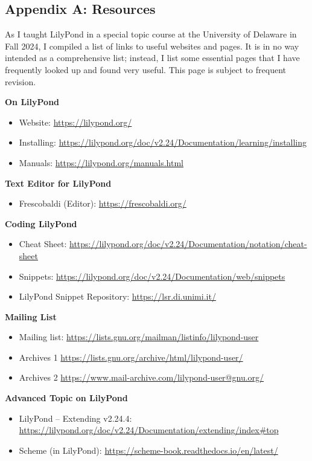 \documentclass[11pt, oneside]{book}   	%
\begin{document}
\begin{appendices}
\chapter{Appendix A: Resources}

As I taught LilyPond in a special topic course at the University of Delaware in Fall 2024, I compiled a list of links to useful websites and pages. It is in no way intended as a comprehensive list; instead, I list some essential pages that I have frequently looked up and found very useful. This page is subject to frequent revision.

\textbf{On LilyPond}
\begin{itemize}
\item Website:	\url{https://lilypond.org/}
\item Installing: \url{https://lilypond.org/doc/v2.24/Documentation/learning/installing}
\item Manuals: \url{https://lilypond.org/manuals.html} 
\end{itemize}
\textbf{Text Editor for LilyPond}
\begin{itemize}
\item Frescobaldi (Editor):	\url{https://frescobaldi.org/}
\end{itemize}
\textbf{Coding LilyPond}
\begin {itemize}
\item Cheat Sheet:	\url{https://lilypond.org/doc/v2.24/Documentation/notation/cheat-sheet}
\item Snippets:	\url{https://lilypond.org/doc/v2.24/Documentation/web/snippets}
\item LilyPond Snippet Repository:	\url{https://lsr.di.unimi.it/}
\end{itemize}
\textbf{Mailing List}
\begin {itemize}
\item Mailing list:		\url{https://lists.gnu.org/mailman/listinfo/lilypond-user} 
\item Archives 1 \url{https://lists.gnu.org/archive/html/lilypond-user/}
\item Archives 2 \url{https://www.mail-archive.com/lilypond-user@gnu.org/} 
\end{itemize}
\textbf{Advanced Topic on LilyPond}
\begin {itemize}
\item LilyPond – Extending v2.24.4: \url{https://lilypond.org/doc/v2.24/Documentation/extending/index#top} 
\item Scheme (in LilyPond):	\url{https://scheme-book.readthedocs.io/en/latest/} 

\end{itemize}
\end{appendices}
\end{document}
